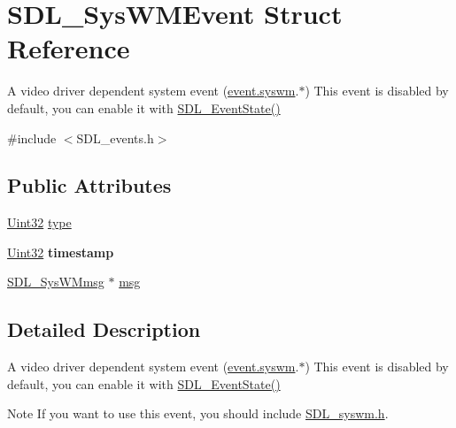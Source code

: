 \hypertarget{struct_s_d_l___sys_w_m_event}{}\section{S\+D\+L\+\_\+\+Sys\+W\+M\+Event Struct Reference}
\label{struct_s_d_l___sys_w_m_event}


A video driver dependent system event (\hyperlink{union_s_d_l___event_ab3b2eaf5348d4c50a51b1f297fdef537}{event.\+syswm}.$\ast$) This event is disabled by default, you can enable it with \hyperlink{_s_d_l__events_8h_afb772893e1c46f186fa39a4defe76df3}{S\+D\+L\+\_\+\+Event\+State()}  




{\ttfamily \#include $<$S\+D\+L\+\_\+events.\+h$>$}

\subsection*{Public Attributes}
\begin{DoxyCompactItemize}
\item 
\hyperlink{_s_d_l__stdinc_8h_add440eff171ea5f55cb00c4a9ab8672d}{Uint32} \hyperlink{struct_s_d_l___sys_w_m_event_a84697e96cb16bf6a570e10b5bfdcd392}{type}
\item 
\hypertarget{struct_s_d_l___sys_w_m_event_a5d3cb97006d99b620c2671c27bd82c06}{}\hyperlink{_s_d_l__stdinc_8h_add440eff171ea5f55cb00c4a9ab8672d}{Uint32} {\bfseries timestamp}\label{struct_s_d_l___sys_w_m_event_a5d3cb97006d99b620c2671c27bd82c06}

\item 
\hyperlink{struct_s_d_l___sys_w_mmsg}{S\+D\+L\+\_\+\+Sys\+W\+Mmsg} $\ast$ \hyperlink{struct_s_d_l___sys_w_m_event_ad5e3dc68aa15582cd0641847d41c74e8}{msg}
\end{DoxyCompactItemize}


\subsection{Detailed Description}
A video driver dependent system event (\hyperlink{union_s_d_l___event_ab3b2eaf5348d4c50a51b1f297fdef537}{event.\+syswm}.$\ast$) This event is disabled by default, you can enable it with \hyperlink{_s_d_l__events_8h_afb772893e1c46f186fa39a4defe76df3}{S\+D\+L\+\_\+\+Event\+State()} 

\begin{DoxyNote}{Note}
If you want to use this event, you should include \hyperlink{_s_d_l__syswm_8h}{S\+D\+L\+\_\+syswm.\+h}. 
\end{DoxyNote}


